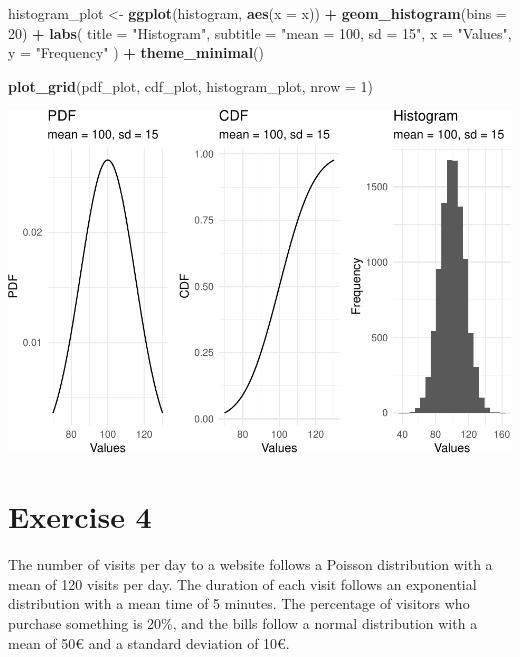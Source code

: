 \documentclass[
]{article}
\newenvironment{Shaded}{\begin{snugshade}}{\end{snugshade}}
\newcommand{\DataTypeTok}[1]{\textcolor[rgb]{0.13,0.29,0.53}{#1}}
\newcommand{\DecValTok}[1]{\textcolor[rgb]{0.00,0.00,0.81}{#1}}
\newcommand{\KeywordTok}[1]{\textcolor[rgb]{0.13,0.29,0.53}{\textbf{#1}}}
\newcommand{\NormalTok}[1]{#1}
\newcommand{\OperatorTok}[1]{\textcolor[rgb]{0.81,0.36,0.00}{\textbf{#1}}}
\newcommand{\StringTok}[1]{\textcolor[rgb]{0.31,0.60,0.02}{#1}}
\begin{document}
\begin{Shaded}
\begin{Highlighting}[]
\NormalTok{histogram\_plot \textless{}{-}}\StringTok{ }\KeywordTok{ggplot}\NormalTok{(histogram, }\KeywordTok{aes}\NormalTok{(}\DataTypeTok{x =}\NormalTok{ x)) }\OperatorTok{+}
\StringTok{  }\KeywordTok{geom\_histogram}\NormalTok{(}\DataTypeTok{bins =} \DecValTok{20}\NormalTok{) }\OperatorTok{+}
\StringTok{  }\KeywordTok{labs}\NormalTok{(}
    \DataTypeTok{title =} \StringTok{"Histogram"}\NormalTok{,}
    \DataTypeTok{subtitle =} \StringTok{"mean = 100, sd = 15"}\NormalTok{,}
    \DataTypeTok{x =} \StringTok{"Values"}\NormalTok{,}
    \DataTypeTok{y =} \StringTok{"Frequency"}
\NormalTok{  ) }\OperatorTok{+}
\StringTok{  }\KeywordTok{theme\_minimal}\NormalTok{()}

\KeywordTok{plot\_grid}\NormalTok{(pdf\_plot, cdf\_plot, histogram\_plot, }\DataTypeTok{nrow =} \DecValTok{1}\NormalTok{)}
\end{Highlighting}
\end{Shaded}

\includegraphics{es_files/figure-latex/unnamed-chunk-12-1.pdf}

\hypertarget{exercise-4}{%
\section{Exercise 4}\label{exercise-4}}

The number of visits per day to a website follows a Poisson distribution
with a mean of 120 visits per day. The duration of each visit follows an
exponential distribution with a mean time of 5 minutes. The percentage
of visitors who purchase something is 20\%, and the bills follow a
normal distribution with a mean of 50€ and a standard deviation of 10€.
\end{document}
